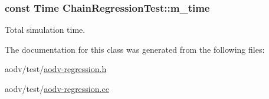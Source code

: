 \subsubsection[{\texorpdfstring{m\+\_\+time}{m_time}}]{\setlength{\rightskip}{0pt plus 5cm}const {\bf Time} Chain\+Regression\+Test\+::m\+\_\+time\hspace{0.3cm}{\ttfamily [private]}}\hypertarget{classChainRegressionTest_aaba809877469a5652b1b62461744e2c7}{}\label{classChainRegressionTest_aaba809877469a5652b1b62461744e2c7}


Total simulation time. 



The documentation for this class was generated from the following files\+:\begin{DoxyCompactItemize}
\item 
aodv/test/\hyperlink{aodv-regression_8h}{aodv-\/regression.\+h}\item 
aodv/test/\hyperlink{aodv-regression_8cc}{aodv-\/regression.\+cc}\end{DoxyCompactItemize}

